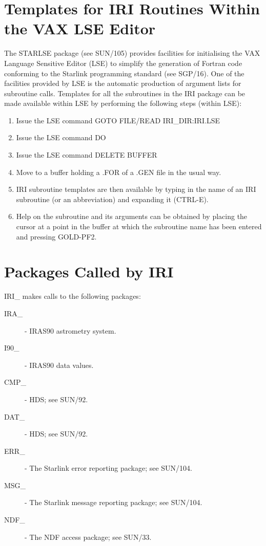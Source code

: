 \section{Templates for IRI Routines Within the VAX LSE Editor}
The STARLSE package (see SUN/105) provides facilities for initialising the VAX
Language Sensitive Editor (LSE) to simplify the generation of Fortran
code conforming to the Starlink programming standard (see SGP/16). One of the
facilities provided by LSE is the automatic production of argument lists for
subroutine calls. Templates for all the subroutines in the IRI package can be
made available within LSE by performing the following steps (within LSE):
\begin{enumerate}
\item Issue the LSE command GOTO FILE/READ IRI\_DIR:IRI.LSE
\item Issue the LSE command DO
\item Issue the LSE command DELETE BUFFER
\item Move to a buffer holding a .FOR of a .GEN file in the usual way.
\item IRI subroutine templates are then available by typing in the name of an
IRI subroutine (or an abbreviation) and expanding it (CTRL-E).
\item Help on the subroutine and its arguments can be obtained by placing the
cursor at a point in the buffer at which the subroutine name has been entered
and pressing GOLD-PF2.
\end{enumerate}

\section{Packages Called by IRI}
IRI\_ makes calls to the following packages:
\begin {description}
\item [IRA\_] - IRAS90 astrometry system.
\item [I90\_] - IRAS90 data values.
\item [CMP\_] - HDS; see SUN/92.
\item [DAT\_] - HDS; see SUN/92.
\item [ERR\_] - The Starlink error reporting package; see SUN/104.
\item [MSG\_] - The Starlink message reporting package; see SUN/104.
\item [NDF\_] - The NDF access package; see SUN/33.
\end{description}

